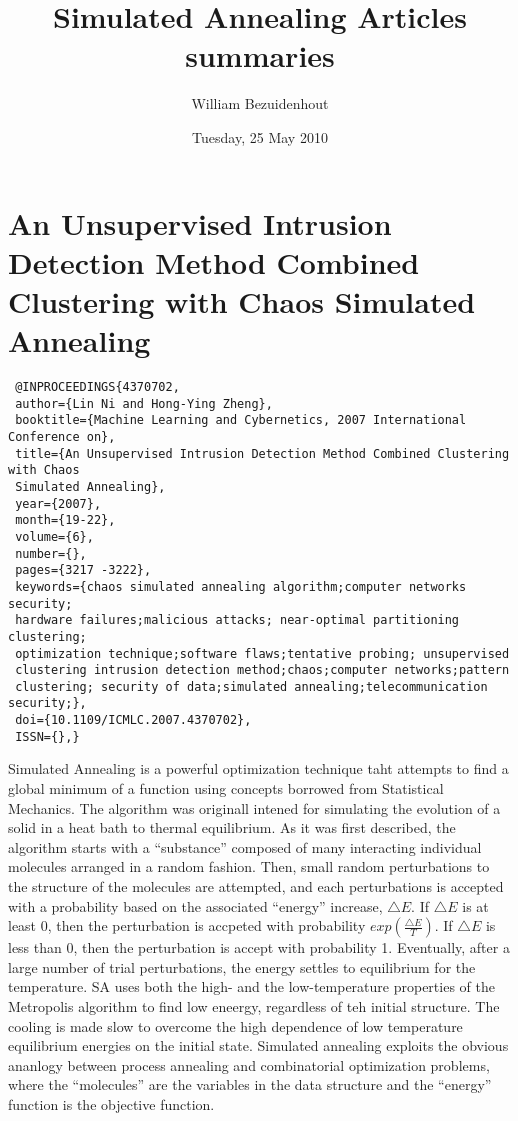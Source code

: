 \documentclass[pdftex,11pt]{article}
\title{Simulated Annealing Articles summaries}
\author{William Bezuidenhout}
\date{Tuesday, 25 May 2010}
\begin{document}
\maketitle
\section*{An Unsupervised Intrusion Detection Method Combined Clustering with Chaos Simulated Annealing}
\begin{verbatim}
 @INPROCEEDINGS{4370702, 
 author={Lin Ni and Hong-Ying Zheng}, 
 booktitle={Machine Learning and Cybernetics, 2007 International Conference on}, 
 title={An Unsupervised Intrusion Detection Method Combined Clustering with Chaos 
 Simulated Annealing}, 
 year={2007}, 
 month={19-22}, 
 volume={6}, 
 number={}, 
 pages={3217 -3222}, 
 keywords={chaos simulated annealing algorithm;computer networks security;
 hardware failures;malicious attacks; near-optimal partitioning clustering;
 optimization technique;software flaws;tentative probing; unsupervised 
 clustering intrusion detection method;chaos;computer networks;pattern 
 clustering; security of data;simulated annealing;telecommunication security;}, 
 doi={10.1109/ICMLC.2007.4370702}, 
 ISSN={},}
\end{verbatim}
Simulated Annealing is a powerful optimization technique taht attempts to find a global minimum of a function using concepts borrowed from Statistical Mechanics. The algorithm was originall intened for simulating the evolution of a solid in a heat bath to thermal equilibrium. As it was first described, the algorithm starts with a ``substance'' composed of many interacting individual molecules arranged in a random fashion. Then, small random perturbations to the structure of the molecules are attempted, and each perturbations is accepted with a probability based on the associated ``energy'' increase, $\triangle{E}$. If $\triangle{E}$ is at least 0, then the perturbation is accpeted with probability $exp(\frac{\triangle{E}}{T})$. If $\triangle{E}$ is less than 0, then the perturbation is accept with probability 1. Eventually, after a large number of trial perturbations, the energy settles to equilibrium for the temperature. SA uses both the high- and the low-temperature properties of the Metropolis algorithm to find low eneergy, regardless of teh initial structure. The cooling is made slow to overcome the high dependence of low temperature equilibrium energies on the initial state. Simulated annealing exploits the obvious ananlogy between process annealing and combinatorial optimization problems, where the ``molecules'' are the variables in the data structure and the ``energy'' function is the objective function.
\end{document}
